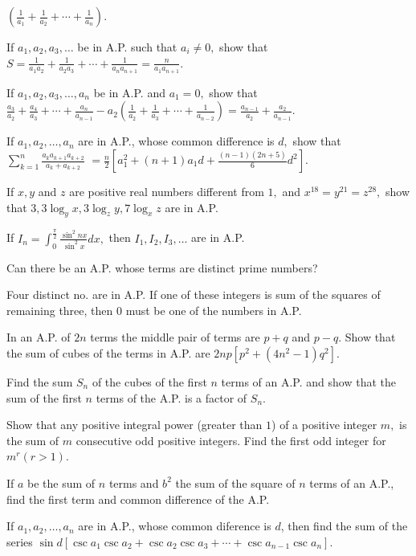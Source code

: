   $\left(\frac{1}{a_1} + \frac{1}{a_2} + \cdots + \frac{1}{a_n}\right)$.
\item If $a_1, a_2, a_3, \ldots$ be in A.P. such that $a_i\neq 0,$ show that $S = \frac{1}{a_1a_2} + \frac{1}{a_2a_3}
  + \cdots + \frac{1}{a_na_{n + 1}} = \frac{n}{a_1a_{n + 1}}$.
\item If $a_1, a_2, a_3, \ldots, a_n$ be in A.P. and $a_1 = 0,$ show that $\frac{a_3}{a_2} + \frac{a_4}{a_3} + \cdots +
  \frac{a_n}{a_{n - 1}} - a_2\left(\frac{1}{a_2} + \frac{1}{a_3} + \cdots + \frac{1}{a_{n - 2}}\right) = \frac{a_{n - 1}}{a_2} +
  \frac{a_2}{a_{n - 1}}$.
\item If $a_1, a_2, \ldots, a_n$ are in A.P., whose common difference is $d,$ show that $\displaystyle\sum_{k = 1}^n\frac{a_ka_{k +
    1}a_{k + 2}}{a_k+a_{k + 2}}$ $= \frac{n}{2}\left[a_1^2 + (n + 1)a_1d + \frac{(n - 1)(2n + 5)}{6}d^2\right]$.
\item If $x, y$ and $z$ are positive real numbers different from $1,$ and $x^{18} = y^{21} = z^{28},$ show that $3, 3\log_y
  x, 3\log_z y, 7\log_x z$ are in A.P.
\item If $\displaystyle I_n = \int_{0}^{\frac{\pi}{2}}\frac{\sin^2nx}{\sin^2x}dx,$ then $I_1, I_2, I_3, \ldots$ are in A.P.
\item Can there be an A.P. whose terms are distinct prime numbers?
\item Four distinct no. are in A.P. If one of these integers is sum of the squares of remaining three, then $0$ must be
  one of the numbers in A.P.
\item In an A.P. of $2n$ terms the middle pair of terms are $p + q$ and $p - q.$ Show that the sum of cubes of the terms
  in A.P. are $2np[p^2 + (4n^2 - 1)q^2]$.
\item Find the sum $S_n$ of the cubes of the first $n$ terms of an A.P. and show that the sum of the first $n$ terms of
  the A.P. is a factor of $S_n$.
\item Show that any positive integral power (greater than $1$) of a positive integer $m,$ is the sum of $m$ consecutive
  odd positive integers. Find the first odd integer for $m^r(r > 1)$.
\item If $a$ be the sum of $n$ terms and $b^2$ the sum of the square of $n$ terms of an A.P., find the first term and
  common difference of the A.P.
\item If $a_1, a_2, \ldots, a_n$ are in A.P., whose common diference is $d$, then find the sum of the series $\sin
  d[\csc a_1\csc a_2 + \csc a_2\csc a_3 + \cdots + \csc a_{n - 1}\csc a_n]$.
